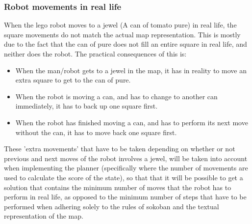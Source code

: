 \subsubsection{Robot movements in real life}
When the lego robot moves to a jewel (A can of tomato pure) in real life, the square movements do not match the actual map representation. This is mostly due to the fact that the can of pure does not fill an entire square in real life, and neither does the robot. The practical consequences of this is:
\begin{itemize}
\item When the man/robot gets to a jewel in the map, it has in reality to move an extra square to get to the can of pure.
\item When the robot is moving a can, and has to change to another can immediately, it has to back up one square first.
\item When the robot has finished moving a can, and has to perform its next move without the can, it has to move back one square first.
\end{itemize}
 
These 'extra movements' that have to be taken depending on whether or not previous and next moves of the robot involves a jewel,  will be taken into account when implementing the planner (specifically where the number of movements are used to calculate the score of the state), so that that it will be possible to get a solution that contains the minimum number of moves that the robot has to perform in real life, as opposed to the minimum number of steps that have to be performed when adhering solely to the rules of sokoban and the textual representation of the map.

